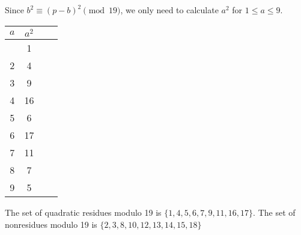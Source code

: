 Since  $b^2 \equiv (p-b)^2 \pmod{19}$, we only need to calculate $a^2$ for 
$1 \leq a \leq 9$.

\begin{table}[H]
\centering
\begin{tabular}{c|cc|c}
	$a$ & $a^2$ \\ \hline
	   & 1  \\
	2   & 4  \\
	3   & 9  \\
	4   & 16 \\
	5   & 6  \\
	6   & 17 \\
	7   & 11 \\
	8   & 7  \\
	9   & 5
\end{tabular}
\end{table}

The set of quadratic residues modulo 19 is $\{1, 4, 5, 6, 7, 9, 11, 16, 17 \}$.
The set of nonresidues modulo 19 is $\{2, 3, 8, 10, 12, 13, 14, 15, 18 \}$
